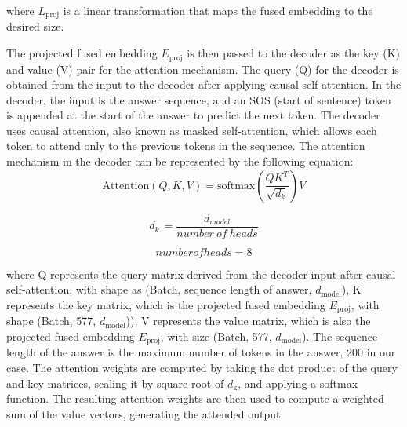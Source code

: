 \documentclass[pdflatex,sn-mathphys-num]{sn-jnl}%
\begin{document}
where $L_{\mathrm{proj}}$ is a linear transformation that maps the fused embedding to the desired size.

The projected fused embedding $E_{\mathrm{proj}}$ is then passed to the decoder as the key (K) and value (V) pair for the attention mechanism. The query (Q) for the decoder is obtained from the input to the decoder after applying causal self-attention.
In the decoder, the input is the answer sequence, and an SOS (start of sentence) token is appended at the start of the answer to predict the next token. The decoder uses causal attention, also known as masked self-attention, which allows each token to attend only to the previous tokens in the sequence.
The attention mechanism in the decoder can be represented by the following equation:
\begin{equation}
    \mathrm{Attention}\left(Q,K,V\right)=\mathrm{softmax}\left(\frac{QK^T}{\sqrt{d_k}}\right)V
\end{equation}

\begin{equation}
    d_{k\ }=\frac{d_{model}}{number\ of\ heads}
\end{equation}

\begin{equation}
    numberofheads=8
\end{equation}

where Q represents the query matrix derived from the decoder input after causal self-attention, with shape as (Batch, sequence length of answer, $d_{\mathrm{model}}$), K represents the key matrix, which is the projected fused embedding $E_{\mathrm{proj}}$, with shape (Batch, 577, $d_{\mathrm{model}}$)), V represents the value matrix, which is also the projected fused embedding $E_{\mathrm{proj}}$, with size (Batch, 577, $d_{\mathrm{model}}$). The sequence length of the answer is the maximum number of tokens in the answer, 200 in our case.
The attention weights are computed by taking the dot product of the query and key matrices, scaling it by square root of $d_{\mathrm{k}}$, and applying a softmax function. The resulting attention weights are then used to compute a weighted sum of the value vectors, generating the attended output.
\end{document}
